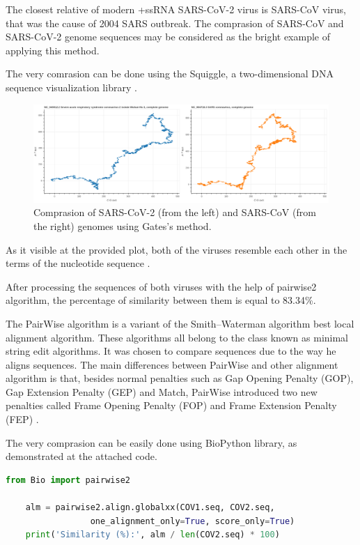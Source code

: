 The closest relative of modern +ssRNA SARS-CoV-2 virus is SARS-CoV virus, that was the cause of 2004 SARS outbreak.
The comprasion of SARS-CoV and SARS-CoV-2 genome sequences may be considered as the bright example of applying this method.

The very comrasion can be done using the Squiggle, a two-dimensional DNA sequence visualization library \cite{Lee2018}.
\begin{figure}[!ht]
	\centering
	\includegraphics[width=1\textwidth]{figures/comprasion.png}
	\caption{Comprasion of SARS-CoV-2 (from the left) and SARS-CoV (from the right) genomes using Gates's method.\label{o:latex_friendly_zone}}
\end{figure}

As it visible at the provided plot, both of the viruses resemble each other in the terms of the nucleotide sequence \cite{2d}.

After processing the sequences of both viruses with the help of pairwise2 algorithm, the percentage of similarity between them is equal to 83.34\%.

The PairWise algorithm is a variant of the Smith–Waterman algorithm best local alignment algorithm. 
These algorithms all belong to the class known as minimal string edit algorithms. 
It was chosen to compare sequences due to the way he aligns sequences.
The main differences between PairWise and other alignment algorithm is that, besides normal penalties such as Gap Opening Penalty (GOP), Gap Extension Penalty (GEP) and Match, PairWise introduced two new penalties called Frame Opening Penalty (FOP) and Frame Extension Penalty (FEP) \cite{pairwise}.

The very comprasion can be easily done using BioPython library, as demonstrated at the attached code.
\begin{lstlisting}[language=Python, caption=Pairwise2 algorithm using BioPython. COV1.seq and COV2.seq are the DNA sequences of SARS-CoV and SARS-CoV-2 viruses. Two arguments of the very alignment are provided to reduce the alignment comlexity and time.]
    from Bio import pairwise2

    alm = pairwise2.align.globalxx(COV1.seq, COV2.seq,
                 one_alignment_only=True, score_only=True)
    print('Similarity (%):', alm / len(COV2.seq) * 100)
\end{lstlisting}

